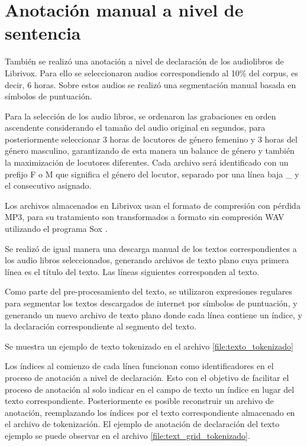 



\section{Anotación manual a nivel de sentencia}

También se realizó una anotación a nivel de declaración de los audiolibros de Librivox. Para ello se seleccionaron audios correspondiendo al 10\% del corpus, es decir, 6 horas. Sobre estos audios se realizó una segmentación manual basada en símbolos de puntuación. 

Para la selección de los audio libros, se ordenaron las grabaciones en orden ascendente considerando el tamaño del audio original en segundos, para posteriormente seleccionar 3 horas de locutores de género femenino y 3 horas del género masculino, garantizando de esta manera un balance de género y también la maximización de locutores diferentes. Cada archivo será identificado con un prefijo F o M que significa el género del locutor, separado por una línea baja \_ y el consecutivo asignado.

Los archivos almacenados en Librivox usan el formato de compresión con pérdida MP3, para su tratamiento son transformados a formato sin compresión WAV utilizando el programa Sox \cite{Sox}.

Se realizó de igual manera una descarga manual de los textos correspondientes a los audio libros seleccionados, generando archivos de texto plano cuya primera línea es el título del texto. Las líneas siguientes corresponden al texto.

Como parte del pre-procesamiento del texto, se utilizaron expresiones regulares para segmentar los textos descargados de internet por símbolos de puntuación, y generando un nuevo archivo de texto plano donde cada línea contiene un índice, y la declaración correspondiente al segmento del texto.

Se muestra un ejemplo de texto tokenizado en el archivo \ref{file:texto_tokenizado}



Los índices al comienzo de cada línea funcionan como identificadores en el proceso de anotación a nivel de declaración. Esto con el objetivo de facilitar el proceso de anotación al solo indicar en el campo de texto un índice en lugar del texto correspondiente. Posteriormente es posible reconstruir un archivo de anotación, reemplazando los índices por el texto correspondiente almacenado en el archivo de tokenización. El ejemplo de anotación de declaración del texto ejemplo se puede observar en el archivo \ref{file:text_grid_tokenizado}.

